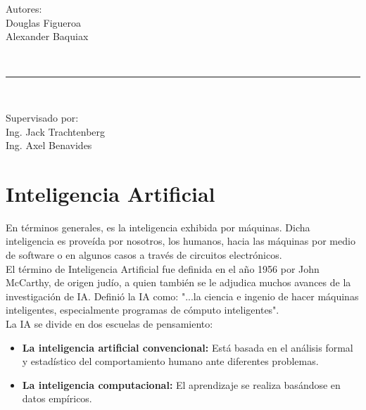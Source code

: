 \documentclass[a4paper,openright,11pt]{article}
\begin{document}
\begin{titlepage}
\begin{center}
		\vspace*{0.9in}
		\begin{large}
			Autores:\\
			Douglas Figueroa \\
			Alexander Baquiax
		\end{large}
		\vspace*{0.3in}
		\\
		\rule{90mm}{0.1mm}\\
		\begin{large}
			Supervisado por: \\
			Ing. Jack Trachtenberg \\
			Ing. Axel Benavides
		\end{large}
	\end{center}
\end{titlepage}
\newpage

\tableofcontents

\newpage

\pagestyle{fancy}


\section{Inteligencia Artificial}
En términos generales, es la inteligencia exhibida por máquinas. Dicha inteligencia es proveída por nosotros, los humanos, hacia las máquinas por medio de software o en algunos casos a través de circuitos electrónicos. \\

El término de Inteligencia Artificial fue definida en el año 1956 por John McCarthy, de origen judío, a quien también se le adjudica muchos avances de la investigación de IA. Definió la IA como: "...la ciencia e ingenio de hacer máquinas inteligentes, especialmente programas de cómputo inteligentes".\\

La IA se divide en dos escuelas de pensamiento:

\begin{itemize}
	\item \textbf{La inteligencia artificial convencional: } Está basada en el análisis formal y estadístico del comportamiento humano ante diferentes problemas.
	\item \textbf{La inteligencia computacional: } El aprendizaje se realiza basándose en datos empíricos.
\end{itemize}
\end{document}
